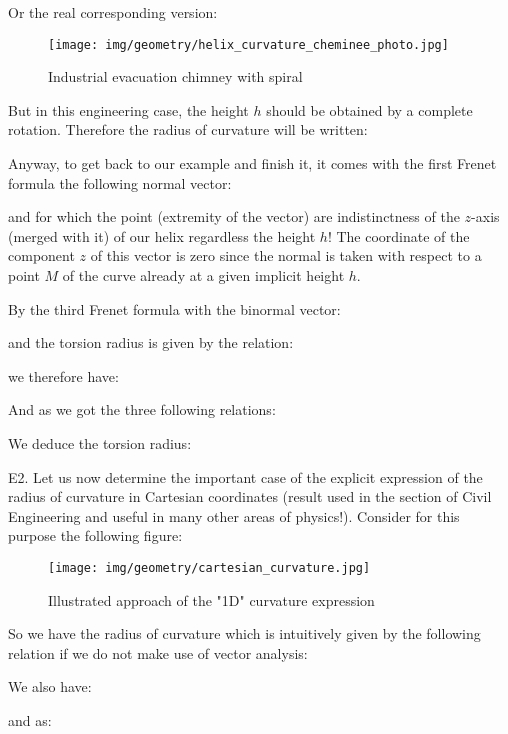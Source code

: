 {	\pagebreak
	\begin{tcolorbox}[colframe=black,colback=white,sharp corners]
	Or the real corresponding version:
	\begin{figure}[H]
		\centering
		\texttt{[image: img/geometry/helix\_curvature\_cheminee\_photo.jpg]}
		\caption[]{Industrial evacuation chimney with spiral}
	\end{figure}
	But in this engineering case, the height $h$ should be obtained by a complete rotation. Therefore the radius of curvature will be written:
	
	Anyway, to get back to our example and finish it, it comes with the first Frenet formula the following normal vector:
	
	and for which the point (extremity of the vector) are indistinctness of the $z$-axis (merged with it) of our helix regardless the height $h$! The coordinate of the component $z$ of this vector is zero since the normal is taken with respect to a point $M$ of the curve already at a given implicit height $h$.
	
	By the third Frenet formula with the binormal vector:
	
	and the torsion radius is given by the relation:
	
	we therefore have:
	\end{tcolorbox}
	
	\pagebreak
	\begin{tcolorbox}[colframe=black,colback=white,sharp corners]
	
	And as we got the three following relations:
	
	We deduce the torsion radius:
	
	
	E2. Let us now determine the important case of the explicit expression of the radius of curvature in Cartesian coordinates (result used in the section of Civil Engineering and useful in many other areas of physics!). Consider for this purpose the following figure:
	\begin{figure}[H]
		\centering
		\texttt{[image: img/geometry/cartesian\_curvature.jpg]}
		\caption[]{Illustrated approach of the "1D" curvature expression}
	\end{figure}
	So we have the radius of curvature which is intuitively given by the following relation if we do not make use of vector analysis:
	
	We also have:
	
	and as:
	
	\end{tcolorbox}
	
}
